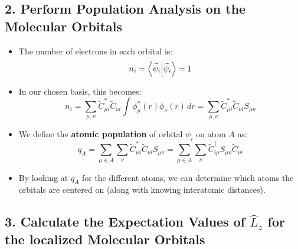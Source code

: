 \documentclass{article}
\begin{document}
\subsection*{2. Perform Population Analysis on the Molecular Orbitals}

\begin{itemize}
    \item The number of electrons in each orbital is:
    \[
    n_i = \braket{\widetilde{\psi}_i} = 1
    \]

    \item In our chosen basis, this becomes:
    \[
    n_i = \sum_{\mu, \nu} \widetilde{C}_{\mu i}^{*} \widetilde{C}_{\nu i} \int \phi_{\mu}^{*}(r) \phi_{\nu}(r) \,dr = \sum_{\mu, \nu} \widetilde{C}_{\mu i}^{*} \widetilde{C}_{\nu i} S_{\mu \nu}
    \]

    \item We define the \textbf{atomic population} of orbital \( \psi_i \) on atom \( A \) as:
    \[
    q_A = \sum_{\mu \in A} \sum_{\nu} \widetilde{C}_{\mu i}^{*} \widetilde{C}_{\nu i} S_{\mu \nu} = \sum_{\mu \in A} \sum_{\nu} \widetilde{C}_{i \mu}^{\dagger} S_{\mu \nu} \widetilde{C}_{\nu i}
    \]

    \item By looking at \( q_A \) for the different atoms, we can determine which atoms the orbitals are centered on (along with knowing interatomic distances).
\end{itemize}

\subsection*{3. Calculate the Expectation Values of \( \hat{L}_z \) for the localized Molecular Orbitals}
\end{document}
